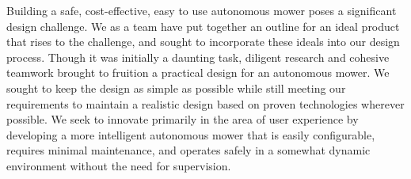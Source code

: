 \documentclass[12pt,letterpaper]{article}
\begin{document}
Building a safe, cost-effective, easy to use autonomous mower poses a significant design challenge.  We as a team have put together an outline for an ideal product that rises to the challenge, and sought to incorporate these ideals into our design process.  Though it was initially a daunting task, diligent research and cohesive teamwork brought to fruition a practical design for an autonomous mower.  We sought to keep the design as simple as possible while still meeting our requirements to maintain a realistic design based on proven technologies wherever possible.  We seek to innovate primarily in the area of user experience by developing a more intelligent autonomous mower that is easily configurable, requires minimal maintenance, and operates safely in a somewhat dynamic environment without the need for supervision.
\end{document}
